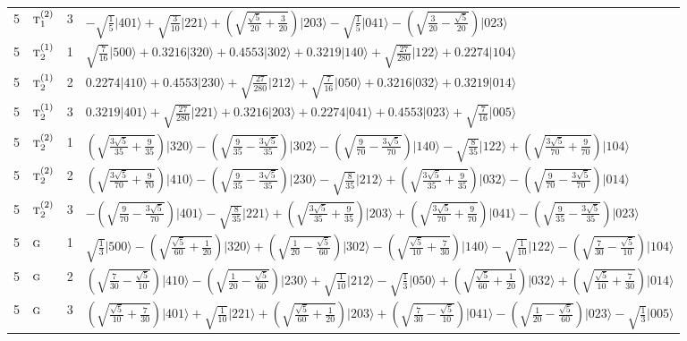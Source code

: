 \documentclass[11pt]{article}
\newcommand{\irr}[1]{\text{\normalfont\scshape #1}}
\newcommand{\occ}[1]{\lvert #1\rangle}
\begin{document}
\begin{longtable}{c l c p{}}
5 & $\irr{t}_{1}^{(2)}$ & 3 & $-\sqrt{\tfrac{1}{5}}\occ{401}+\sqrt{\tfrac{3}{10}}\occ{221}+(\sqrt{\frac{\sqrt{5}}{20} + \frac{3}{20}})\occ{203}-\sqrt{\tfrac{1}{5}}\occ{041}-(\sqrt{\frac{3}{20} - \frac{\sqrt{5}}{20}})\occ{023}$\\
5 & $\irr{t}_{2}^{(1)}$ & 1 & $\sqrt{\tfrac{7}{16}}\occ{500}+0.3216\occ{320}+0.4553\occ{302}+0.3219\occ{140}+\sqrt{\tfrac{27}{280}}\occ{122}+0.2274\occ{104}$\\
5 & $\irr{t}_{2}^{(1)}$ & 2 & $0.2274\occ{410}+0.4553\occ{230}+\sqrt{\tfrac{27}{280}}\occ{212}+\sqrt{\tfrac{7}{16}}\occ{050}+0.3216\occ{032}+0.3219\occ{014}$\\
5 & $\irr{t}_{2}^{(1)}$ & 3 & $0.3219\occ{401}+\sqrt{\tfrac{27}{280}}\occ{221}+0.3216\occ{203}+0.2274\occ{041}+0.4553\occ{023}+\sqrt{\tfrac{7}{16}}\occ{005}$\\
5 & $\irr{t}_{2}^{(2)}$ & 1 & $(\sqrt{\frac{3 \sqrt{5}}{35} + \frac{9}{35}})\occ{320}-(\sqrt{\frac{9}{35} - \frac{3 \sqrt{5}}{35}})\occ{302}-(\sqrt{\frac{9}{70} - \frac{3 \sqrt{5}}{70}})\occ{140}-\sqrt{\tfrac{8}{35}}\occ{122}+(\sqrt{\frac{3 \sqrt{5}}{70} + \frac{9}{70}})\occ{104}$\\
5 & $\irr{t}_{2}^{(2)}$ & 2 & $(\sqrt{\frac{3 \sqrt{5}}{70} + \frac{9}{70}})\occ{410}-(\sqrt{\frac{9}{35} - \frac{3 \sqrt{5}}{35}})\occ{230}-\sqrt{\tfrac{8}{35}}\occ{212}+(\sqrt{\frac{3 \sqrt{5}}{35} + \frac{9}{35}})\occ{032}-(\sqrt{\frac{9}{70} - \frac{3 \sqrt{5}}{70}})\occ{014}$\\
5 & $\irr{t}_{2}^{(2)}$ & 3 & $-(\sqrt{\frac{9}{70} - \frac{3 \sqrt{5}}{70}})\occ{401}-\sqrt{\tfrac{8}{35}}\occ{221}+(\sqrt{\frac{3 \sqrt{5}}{35} + \frac{9}{35}})\occ{203}+(\sqrt{\frac{3 \sqrt{5}}{70} + \frac{9}{70}})\occ{041}-(\sqrt{\frac{9}{35} - \frac{3 \sqrt{5}}{35}})\occ{023}$\\
5 & $\irr{g}$ & 1 & $\sqrt{\tfrac{1}{3}}\occ{500}-(\sqrt{\frac{\sqrt{5}}{60} + \frac{1}{20}})\occ{320}+(\sqrt{\frac{1}{20} - \frac{\sqrt{5}}{60}})\occ{302}-(\sqrt{\frac{\sqrt{5}}{10} + \frac{7}{30}})\occ{140}-\sqrt{\tfrac{1}{10}}\occ{122}-(\sqrt{\frac{7}{30} - \frac{\sqrt{5}}{10}})\occ{104}$\\
5 & $\irr{g}$ & 2 & $(\sqrt{\frac{7}{30} - \frac{\sqrt{5}}{10}})\occ{410}-(\sqrt{\frac{1}{20} - \frac{\sqrt{5}}{60}})\occ{230}+\sqrt{\tfrac{1}{10}}\occ{212}-\sqrt{\tfrac{1}{3}}\occ{050}+(\sqrt{\frac{\sqrt{5}}{60} + \frac{1}{20}})\occ{032}+(\sqrt{\frac{\sqrt{5}}{10} + \frac{7}{30}})\occ{014}$\\
5 & $\irr{g}$ & 3 & $(\sqrt{\frac{\sqrt{5}}{10} + \frac{7}{30}})\occ{401}+\sqrt{\tfrac{1}{10}}\occ{221}+(\sqrt{\frac{\sqrt{5}}{60} + \frac{1}{20}})\occ{203}+(\sqrt{\frac{7}{30} - \frac{\sqrt{5}}{10}})\occ{041}-(\sqrt{\frac{1}{20} - \frac{\sqrt{5}}{60}})\occ{023}-\sqrt{\tfrac{1}{3}}\occ{005}$\\

\end{longtable}
\end{document}
